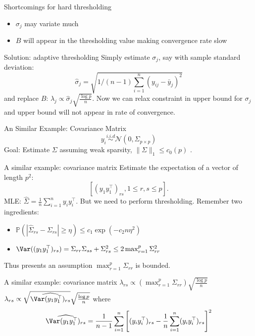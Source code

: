 \documentclass[handout,xcolor={usenames,dvipsnames}]{beamer}
\begin{document}
\begin{frame}{Shortcomings for hard thresholding}
\begin{itemize}
	\item $\sigma_j$ may variate much
	\item $B$ will appear in the thresholding value making convergence rate slow 
\end{itemize}
\end{frame}


\begin{frame}{Solution: adaptive thresholding}
Simply estimate $\sigma_j$, say with sample standard deviation: 
\[
\hat{\sigma}_j = \sqrt{1/(n-1)\sum_{i=1}^n (y_{ij} - \bar{y}_j)^2}
\]
and replace $B$: $\lambda_j \propto \hat{\sigma}_j \sqrt{\frac{\log p}{n}}$.  Now we can relax constraint in upper bound for $\sigma_j$ and upper bound will not appear in rate of convergence. 
\end{frame}

\begin{frame}{An Similar Example: Covariance Matrix}
\[
y_i \overset{i.i.d}{\sim} \mathcal{N}(0, \Sigma_{p\times p})
\]
{\color{red} Goal:} Estimate $\Sigma$ assuming weak sparsity, $\|\Sigma\|_{1}\le c_0(p)$ .  \cite{bickel2008covariance}
\end{frame}


\begin{frame}{A similar example: covariance matrix}
Estimate the expectation of a vector of length $p^2$:
\[
[(y_1y_1^\top )_{rs}, 1\le r, s\le p]. 
\]
{\color{red} MLE:} $\hat{\Sigma} = \frac{1}{n} \sum_{i=1}^n y_i y_i^\top$.  But we need to perform thresholding.  Remember two ingredients:
\begin{itemize}
\item $\mathbb{P}(|\hat{\Sigma}_{rs} - \Sigma_{rs}|\ge \eta) \le c_1\exp(-c_2n\eta^2)$
\item $\Var((y_1y_1^\top)_{rs}) = \Sigma_{rr}\Sigma_{ss}+\Sigma^2_{rs} \le 2\max_{r=1}^p\Sigma^2_{rr}$
\end{itemize}
Thus \cite{bickel2008covariance} presents an assumption $\max_{r=1}^p\Sigma_{rr}$ is bounded. 
\end{frame}

\begin{frame}{A similar example: covariance matrix}
 $\lambda_{rs} \propto (\max_{r=1}^p \Sigma_{rr}) \sqrt{\frac{\log p}{n}}$ \\ 
 $\lambda_{rs} \propto \sqrt{\widehat{\Var(y_1y_1^\top)_{rs}}}\sqrt{\frac{\log p}{n}}$
where 
\[
\widehat{\Var(y_1y_1^\top)_{rs}} = \frac{1}{n-1}\sum_{i=1}^n \left[(y_iy_i^\top)_{rs} -  \frac{1}{n} \sum_{i=1}^n (y_iy_i^\top)_{rs} \right]^2
\]
\end{frame}
\end{document}
